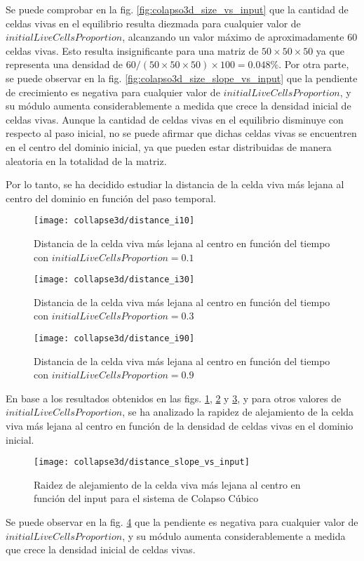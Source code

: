 Se puede comprobar en la fig. \ref{fig:colapso3d_size_vs_input} que la cantidad de celdas vivas en el equilibrio
resulta diezmada para cualquier valor de $initialLiveCellsProportion$, alcanzando un valor máximo de aproximadamente
60 celdas vivas.
Esto resulta insignificante para una matriz de $50 \times 50 \times 50$ ya que representa una densidad
de $60/(50 \times 50 \times 50) \times 100 = 0.048\%$.
Por otra parte, se puede observar en la fig. \ref{fig:colapso3d_size_slope_vs_input} que la pendiente de
crecimiento es negativa para cualquier valor de $initialLiveCellsProportion$, y su módulo aumenta
considerablemente a medida que crece la densidad inicial de celdas vivas.
Aunque la cantidad de celdas vivas en el equilibrio disminuye con respecto al paso inicial, no se puede afirmar
que dichas celdas vivas se encuentren en el centro del dominio inicial, ya que pueden estar distribuidas de manera
aleatoria en la totalidad de la matriz.

Por lo tanto, se ha decidido estudiar la distancia de la celda viva más lejana al centro del dominio en función del
paso temporal.

\begin{figure}[H]
    \centering
    \texttt{[image: collapse3d/distance\_i10]}
    \caption{Distancia de la celda viva más lejana al centro en función del tiempo con $initialLiveCellsProportion = 0.1$}
    \label{fig:colapso3d_d10}
\end{figure}
\begin{figure}[H]
    \centering
    \texttt{[image: collapse3d/distance\_i30]}
    \caption{Distancia de la celda viva más lejana al centro en función del tiempo con $initialLiveCellsProportion = 0.3$}
    \label{fig:colapso3d_d30}
\end{figure}
\begin{figure}[H]
    \centering
    \texttt{[image: collapse3d/distance\_i90]}
    \caption{Distancia de la celda viva más lejana al centro en función del tiempo con $initialLiveCellsProportion = 0.9$}
    \label{fig:colapso3d_d90}
\end{figure}

En base a los resultados obtenidos en las figs. \ref{fig:colapso3d_d10}, \ref{fig:colapso3d_d30} y \ref{fig:colapso3d_d90},
y para otros valores de $initialLiveCellsProportion$, se ha analizado la rapidez de alejamiento de la celda viva más lejana
al centro en función de la densidad de celdas vivas en el dominio inicial.

\begin{figure}[H]
    \centering
    \texttt{[image: collapse3d/distance\_slope\_vs\_input]}
    \caption{Raidez de alejamiento de la celda viva más lejana al centro en función del input para el sistema de Colapso Cúbico}
    \label{fig:colapso3d_distance_slope_vs_input}
\end{figure}

Se puede observar en la fig. \ref{fig:colapso3d_distance_slope_vs_input} que la pendiente es negativa
para cualquier valor de $initialLiveCellsProportion$, y su módulo aumenta considerablemente
a medida que crece la densidad inicial de celdas vivas.
